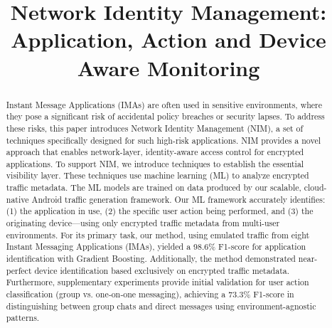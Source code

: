 \documentclass[conference]{IEEEtran}
\begin{document}
\title{Network Identity Management: Application, Action and Device Aware Monitoring }

\author{
\and
{}
\and
{}
}

\maketitle



\begin{abstract}
Instant Message Applications (IMAs) are often used in sensitive environments, where they pose a significant risk of accidental policy breaches or security lapses. To address these risks, this paper introduces Network Identity Management (NIM), a set of techniques specifically designed for such high-risk applications. NIM provides a novel approach that enables network-layer, identity-aware access control for encrypted applications. To support NIM, we introduce techniques to establish the essential visibility layer. These techniques use machine learning (ML) to analyze encrypted traffic metadata. The ML models are trained on data produced by our scalable, cloud-native Android traffic generation framework. Our ML framework accurately identifies: (1) the application in use, (2) the specific user action being performed, and (3) the originating device—using only encrypted traffic metadata from multi-user environments. For its primary task, our method, using emulated traffic from eight Instant Messaging Applications (IMAs), yielded a 98.6\% F1-score for application identification with Gradient Boosting. Additionally, the method demonstrated near-perfect device identification based exclusively on encrypted traffic metadata. Furthermore, supplementary experiments provide initial validation for user action classification (group vs. one‑on‑one messaging), achieving a 73.3\% F1-score in distinguishing between group chats and direct messages using environment-agnostic patterns. 
\end{abstract}
\end{document}
